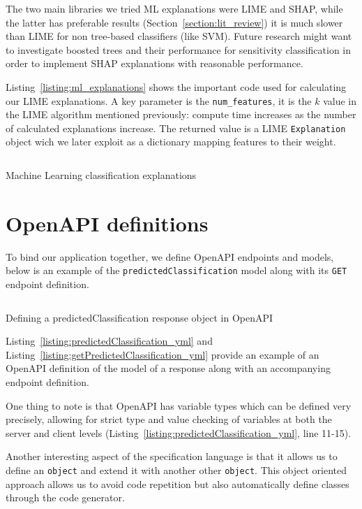 \documentclass[\version]{l4proj}
\begin{document}
The two main libraries we tried ML explanations were LIME and SHAP, while the latter has preferable results (Section~\ref{section:lit_review}) it is much slower than LIME for non tree-based classifiers (like SVM).
Future research might want to investigate boosted trees \autocite{chenXGBoostScalableTree2016} and their performance for sensitivity classification in order to implement SHAP explanations with reasonable performance.

Listing~\ref{listing:ml_explanations} shows the important code used for calculating our LIME explanations.
A key parameter is the \verb|num_features|, it is the $k$ value in the LIME algorithm mentioned previously: compute time increases as the number of calculated explanations increase.
The returned value is a LIME \verb|Explanation| object wich we later exploit as a dictionary mapping features to their weight.

\begin{listing}[H]
    \inputminted{python}{code/explanations.py}
    \caption{Machine Learning classification explanations}\label{listing:ml_explanations}
\end{listing}

\section{OpenAPI definitions}

To bind our application together, we define OpenAPI endpoints and models, below is an example of the \verb|predictedClassification| model along with its \verb|GET| endpoint definition.

\begin{listing}[H]
    \inputminted{yaml}{code/predictedClassification.yml}
    \caption{Defining a predictedClassification response object in OpenAPI}\label{listing:predictedClassification_yml}
\end{listing}

Listing~\ref{listing:predictedClassification_yml} and Listing~\ref{listing:getPredictedClassification_yml} provide an example of an OpenAPI definition of the model of a response along with an accompanying endpoint definition.

One thing to note is that OpenAPI has variable types which can be defined very precisely, allowing for strict type and value checking of variables at both the server and client levels (Listing~\ref{listing:predictedClassification_yml}, line 11-15).

Another interesting aspect of the specification language is that it allows us to define an \verb|object| and extend it with another other \verb|object|.
This object oriented approach allows us to avoid code repetition but also automatically define classes through the code generator.
\end{document}
